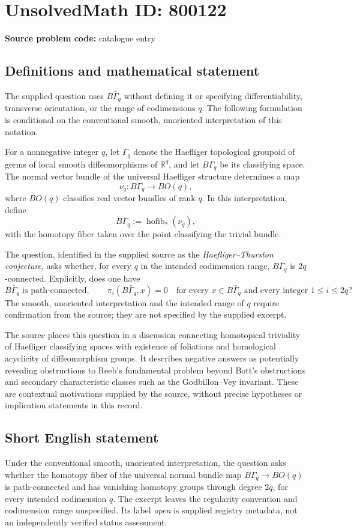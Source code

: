\documentclass[11pt]{article}
\newcommand{\R}{\mathbb{R}}
\begin{document}
\section*{UnsolvedMath ID: 800122}
\textbf{Source problem code:} catalogue entry
\subsection{Definitions and mathematical statement}
The supplied question uses $B\bar\Gamma_q$ without defining it or specifying differentiability, transverse orientation, or the range of codimensions $q$. The following formulation is conditional on the conventional smooth, unoriented interpretation of this notation.

For a nonnegative integer $q$, let $\Gamma_q$ denote the Haefliger topological groupoid of germs of local smooth diffeomorphisms of $\R^q$, and let $B\Gamma_q$ be its classifying space. The normal vector bundle of the universal Haefliger structure determines a map
\[
\nu_q:B\Gamma_q\longrightarrow BO(q),
\]
where $BO(q)$ classifies real vector bundles of rank $q$. In this interpretation, define
\[
B\bar\Gamma_q:=\operatorname{hofib}_{*}(\nu_q),
\]
with the homotopy fiber taken over the point classifying the trivial bundle.

The question, identified in the supplied source as the \emph{Haefliger--Thurston conjecture}, asks whether, for every $q$ in the intended codimension range, $B\bar\Gamma_q$ is $2q$-connected. Explicitly, does one have
\[
B\bar\Gamma_q\text{ is path-connected},\qquad
\pi_i(B\bar\Gamma_q,x)=0
\quad\text{for every }x\in B\bar\Gamma_q
\text{ and every integer }1\leq i\leq 2q?
\]
The smooth, unoriented interpretation and the intended range of $q$ require confirmation from the source; they are not specified by the supplied excerpt.

The source places this question in a discussion connecting homotopical triviality of Haefliger classifying spaces with existence of foliations and homological acyclicity of diffeomorphism groups. It describes negative answers as potentially revealing obstructions to Reeb's fundamental problem beyond Bott's obstructions and secondary characteristic classes such as the Godbillon--Vey invariant. These are contextual motivations supplied by the source, without precise hypotheses or implication statements in this record.
\subsection{Short English statement}
Under the conventional smooth, unoriented interpretation, the question asks whether the homotopy fiber of the universal normal bundle map $B\Gamma_q\to BO(q)$ is path-connected and has vanishing homotopy groups through degree $2q$, for every intended codimension $q$. The excerpt leaves the regularity convention and codimension range unspecified. Its label \emph{open} is supplied registry metadata, not an independently verified status assessment.
\end{document}
